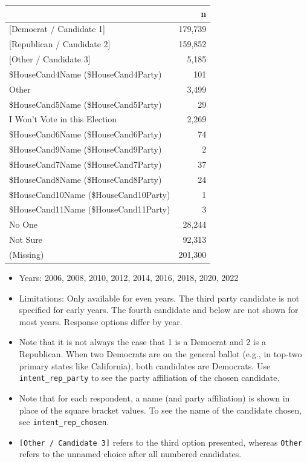 \documentclass[10pt,article,oneside]{memoir}
\theoremstyle{definition}
\begin{document}
\begin{table}[H]
\centering
\begin{tabular}[t]{lr}
\toprule
 & n\\
\midrule
{}{[Democrat / Candidate 1]} & 179,739\\
{}{[Republican / Candidate 2]} & 159,852\\
{}{[Other / Candidate 3]} & 5,185\\
\$HouseCand4Name (\$HouseCand4Party) & 101\\
Other & 3,499\\
\$HouseCand5Name (\$HouseCand5Party) & 29\\
I Won't Vote in this Election & 2,269\\
\$HouseCand6Name (\$HouseCand6Party) & 74\\
\$HouseCand9Name (\$HouseCand9Party) & 2\\
\$HouseCand7Name (\$HouseCand7Party) & 37\\
\$HouseCand8Name (\$HouseCand8Party) & 24\\
\$HouseCand10Name (\$HouseCand10Party) & 1\\
\$HouseCand11Name (\$HouseCand11Party) & 3\\
No One & 28,244\\
Not Sure & 92,313\\
(Missing) & 201,300\\
\bottomrule
\end{tabular}
\end{table}

\begin{itemize}
\tightlist
\item
  Years: 2006, 2008, 2010, 2012, 2014, 2016, 2018, 2020, 2022
\item
  Limitations: Only available for even years. The third party candidate
  is not specified for early years. The fourth candidate and below are
  not shown for most years. Response options differ by year.
\item
  Note that it is not always the case that 1 is a Democrat and 2 is a
  Republican. When two Democrats are on the general ballot (e.g., in
  top-two primary states like California), both candidates are
  Democrats. Use \texttt{intent\_rep\_party} to see the party
  affiliation of the chosen candidate.
\item
  Note that for each respondent, a name (and party affiliation) is shown
  in place of the square bracket values. To see the name of the
  candidate chosen, see \texttt{intent\_rep\_chosen}.
\item
  \texttt{{[}Other\ /\ Candidate\ 3{]}} refers to the third option
  presented, whereas \texttt{Other} refers to the unnamed choice after
  all numbered candidates.
\end{itemize}
\end{document}
